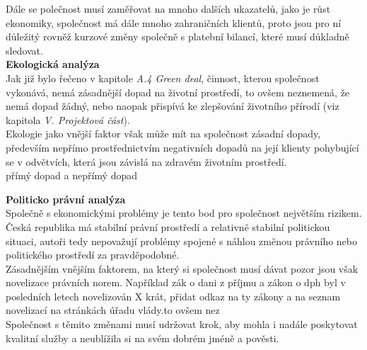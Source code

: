 Dále se polečnost musí zaměřovat na mnoho dalších ukazatelů, jako je růst ekonomiky, společnost má dále mnoho zahraničních klientů, proto jsou pro ní důležitý rovněž kurzové změny společně s platební bilancí, které musí důkladně sledovat.\\




\noindent\textbf{Ekologická analýza}\\

Jak již bylo řečeno v kapitole \textit{A.4 Green deal}, činnost, kterou společnost vykonává, nemá zásadnější dopad na životní prostředí, to ovšem neznemená, že nemá dopad žádný, nebo naopak přispívá ke zlepšování životního přírodí (viz kapitola \textit{V. Projektová část}).\\

Ekologie jako vnější faktor však může mít na společnost zásadní dopady, především nepřímo prostřednictvím negativních dopadů na její klienty pohybující se v odvětvích, která jsou závislá na zdravém životním prostředí.\\

přímý dopad a nepřímý dopad

\noindent\textbf{Politicko právní analýza}\\

Společně s ekonomickými problémy je tento bod pro společnost největším rizikem. Česká republika má stabilní právní prostředí a relativně stabilní politickou situaci, autoři tedy nepovažují problémy spojené s náhlou změnou právního nebo politického prostředí za pravděpodobné.\\

Zásadnějším vnějším faktorem, na který si společnost musí dávat pozor jsou však novelizace právních norem. Například zák o dani z příjmu a zákon o dph byl v posledních letech novelizován X krát, přidat odkaz na ty zákony a na seznam novelizací na stránkách úřadu vlády.to ovšem nez\\

Společnost s těmito změnami musí udržovat krok, aby mohla i nadále poskytovat kvalitní služby a neublížila si na svém dobrém jméně a pověsti.\\

